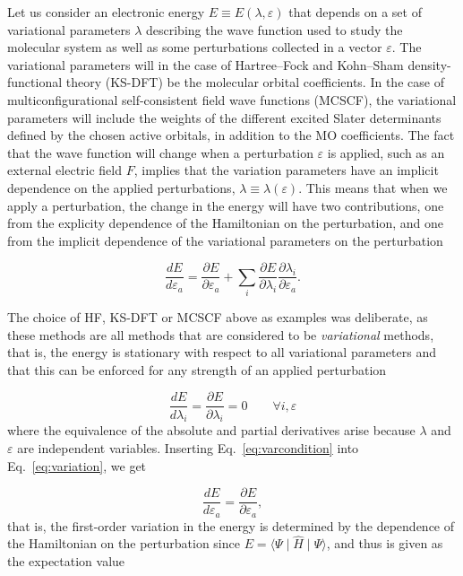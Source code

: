 \documentclass[%
 reprint,
 amsmath,amssymb,
 aps,
]{revtex4-1}
\begin{document}
Let us consider an electronic energy $E\equiv
E\left(\lambda,\varepsilon\right)$ that depends on a set of variational
parameters $\lambda$ describing the wave function used to study the
molecular system as well as some perturbations collected in a vector
$\varepsilon$. The variational parameters will in the case of
Hartree--Fock and Kohn--Sham density-functional theory (KS-DFT) be the
molecular orbital coefficients. In the case of
multiconfigurational self-consistent field wave functions (MCSCF), the
variational parameters will include the weights of the different
excited Slater determinants defined by the chosen active orbitals, in
addition to the MO coefficients. The fact that the wave function will
change when a perturbation $\varepsilon$ is applied, such as an external
electric field $F$, implies that the variation parameters have an
implicit dependence on the applied perturbations, $\lambda\equiv
\lambda\left(\varepsilon\right)$. This means that when we apply a
perturbation, the change in the energy will have two contributions,
one from the explicity dependence of the Hamiltonian on the
perturbation, and one from the implicit dependence of the variational
parameters on the perturbation

\begin{equation}
\frac{dE}{d\varepsilon_a} = \frac{\partial E}{\partial\varepsilon_a} + \sum_i
\frac{\partial
  E}{\partial\lambda_i}\frac{\partial\lambda_i}{\partial\varepsilon_a}.
\label{eq:variation}
\end{equation}

The choice of HF, KS-DFT or MCSCF above as examples was deliberate, as these
methods are all methods that are considered to be {\em variational\/}
methods, that is, the energy is stationary with respect to all
variational parameters and that this can be enforced for any strength
of an applied perturbation

\begin{equation}
\frac{dE}{d\lambda_i} = \frac{\partial E}{\partial\lambda_i} =
0\qquad\forall i, \varepsilon
\label{eq:varcondition}
\end{equation}
where the equivalence of the absolute and partial derivatives arise
because $\lambda$ and $\varepsilon$ are independent variables. Inserting
Eq.~\eqref{eq:varcondition} into Eq.~\eqref{eq:variation}, we get

\begin{equation}
\frac{dE}{d\varepsilon_a} = \frac{\partial E}{\partial\varepsilon_a},
\end{equation}
that is, the first-order variation in the energy is determined by the
dependence of the Hamiltonian on the perturbation since
$E=\langle\Psi\mid\hat{H}\mid\Psi\rangle$, and thus is given as the
  expectation value
\end{document}
